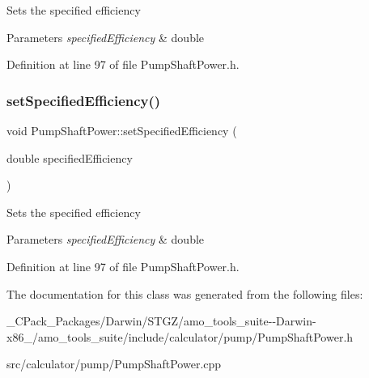 Sets the specified efficiency 
\begin{DoxyParams}{Parameters}
{\em specified\+Efficiency} & double \\
\hline
\end{DoxyParams}


Definition at line 97 of file Pump\+Shaft\+Power.\+h.

\mbox{\label{class_pump_shaft_power_a7d2c64ba11fb287d9b46f7d0890ee988}} 
\subsubsection{\texorpdfstring{set\+Specified\+Efficiency()}{setSpecifiedEfficiency()}\hspace{0.1cm}{\footnotesize\ttfamily [3/3]}}
{\footnotesize\ttfamily void Pump\+Shaft\+Power\+::set\+Specified\+Efficiency (\begin{DoxyParamCaption}\item[{double}]{specified\+Efficiency }\end{DoxyParamCaption})\hspace{0.3cm}{\ttfamily [inline]}}

Sets the specified efficiency 
\begin{DoxyParams}{Parameters}
{\em specified\+Efficiency} & double \\
\hline
\end{DoxyParams}


Definition at line 97 of file Pump\+Shaft\+Power.\+h.



The documentation for this class was generated from the following files\+:\begin{DoxyCompactItemize}
\item 
\+\_\+\+C\+Pack\+\_\+\+Packages/\+Darwin/\+S\+T\+G\+Z/amo\+\_\+tools\+\_\+suite-\/-\/\+Darwin-\/x86\+\_/amo\+\_\+tools\+\_\+suite/include/calculator/pump/Pump\+Shaft\+Power.\+h\item 
src/calculator/pump/Pump\+Shaft\+Power.\+cpp\end{DoxyCompactItemize}
